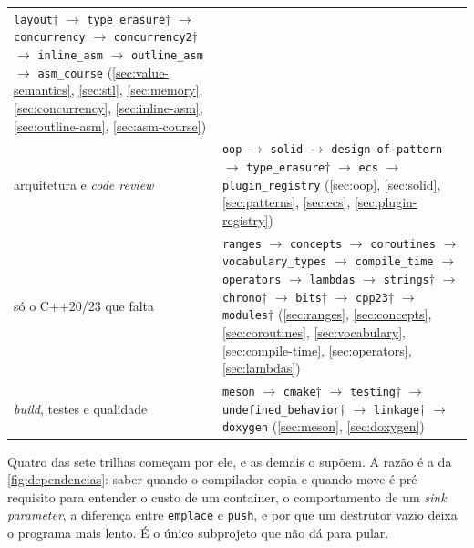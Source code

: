 \begin{table}[htbp]
\begin{tabular}{@{}lp{}@{}}
    \texttt{layout}$\dagger$ $\rightarrow$ \texttt{type\_erasure}$\dagger$
    $\rightarrow$ \texttt{concurrency} $\rightarrow$
    \texttt{concurrency2}$\dagger$ $\rightarrow$ \texttt{inline\_asm}
    $\rightarrow$ \texttt{outline\_asm} $\rightarrow$ \texttt{asm\_course}
    (\ref{sec:value-semantics}, \ref{sec:stl}, \ref{sec:memory},
     \ref{sec:concurrency}, \ref{sec:inline-asm}, \ref{sec:outline-asm},
     \ref{sec:asm-course}) \\[4pt]
arquitetura e \emph{code review} &
    \texttt{oop} $\rightarrow$ \texttt{solid} $\rightarrow$
    \texttt{design-of-pattern} $\rightarrow$ \texttt{type\_erasure}$\dagger$
    $\rightarrow$ \texttt{ecs} $\rightarrow$ \texttt{plugin\_registry}
    (\ref{sec:oop}, \ref{sec:solid}, \ref{sec:patterns}, \ref{sec:ecs},
     \ref{sec:plugin-registry}) \\[4pt]
só o C++20/23 que falta &
    \texttt{ranges} $\rightarrow$ \texttt{concepts} $\rightarrow$
    \texttt{coroutines} $\rightarrow$ \texttt{vocabulary\_types} $\rightarrow$
    \texttt{compile\_time} $\rightarrow$ \texttt{operators} $\rightarrow$
    \texttt{lambdas} $\rightarrow$ \texttt{strings}$\dagger$ $\rightarrow$
    \texttt{chrono}$\dagger$ $\rightarrow$ \texttt{bits}$\dagger$
    $\rightarrow$ \texttt{cpp23}$\dagger$ $\rightarrow$
    \texttt{modules}$\dagger$
    (\ref{sec:ranges}, \ref{sec:concepts}, \ref{sec:coroutines},
     \ref{sec:vocabulary}, \ref{sec:compile-time}, \ref{sec:operators},
     \ref{sec:lambdas}) \\[4pt]
\emph{build}, testes e qualidade &
    \texttt{meson} $\rightarrow$ \texttt{cmake}$\dagger$ $\rightarrow$
    \texttt{testing}$\dagger$ $\rightarrow$
    \texttt{undefined\_behavior}$\dagger$ $\rightarrow$
    \texttt{linkage}$\dagger$ $\rightarrow$ \texttt{doxygen}
    (\ref{sec:meson}, \ref{sec:doxygen}) \\
\bottomrule
\end{tabular}
\end{table}

\begin{regra}
Quatro das sete trilhas começam por ele, e as demais o supõem. A razão é a da
\cref{fig:dependencias}: saber quando o compilador copia e quando move é
pré-requisito para entender o custo de um container, o comportamento de um
\emph{sink parameter}, a diferença entre \texttt{emplace} e \texttt{push}, e por
que um destrutor vazio deixa o programa mais lento. É o único subprojeto que
não dá para pular.
\end{regra}

